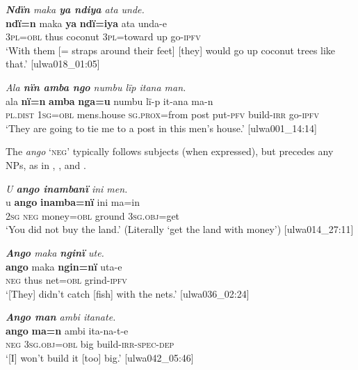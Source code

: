 \ea%
    \label{ex:clause:71}
          \textit{\textbf{Ndïn} maka \textbf{ya ndiya} ata unde.}\\
\gll    \textbf{ndï=n}    maka  \textbf{ya}      \textbf{ndï=iya}    ata  unda-e\\
    3\textsc{pl=obl}  thus  coconut  3\textsc{pl=}toward  up  go-\textsc{ipfv}\\
\glt `With them [= straps around their feet] [they] would go up coconut trees like that.’ [ulwa018\_01:05]
\z

\ea%
    \label{ex:clause:72}
          \textit{Ala \textbf{nïn amba ngo} numbu lïp itana man.}\\
\gll    ala      \textbf{nï=n}    \textbf{amba}      \textbf{nga=u}        numbu lï-p      it-ana    ma-n\\
    \textsc{pl.dist}  1\textsc{sg=obl}  mens.house  \textsc{sg.prox=}from  post    put-\textsc{pfv}  build\textsc{{}-irr} go\textsc{{}-ipfv}\\
\glt `They are going to tie me to a post in this men’s house.’ [ulwa001\_14:14]
\z

The  \textit{ango} ‘\textsc{neg}’ typically follows subjects (when expressed), but precedes any  NPs, as in , , and .

\ea%
    \label{ex:clause:73}
          \textit{U \textbf{ango inambanï} ini men.}\\
\gll    u    \textbf{ango}  \textbf{inamba=nï}  ini      ma=in\\
    2\textsc{sg}  \textsc{neg}  money=\textsc{obl}  ground    3\textsc{sg.obj}=get\\
\glt `You did not buy the land.’ (Literally ‘get the land with money’) [ulwa014\_27:11]
\z

\ea%
    \label{ex:clause:74}
          \textit{\textbf{Ango} maka \textbf{nginï} ute.}\\
\gll    \textbf{ango}  maka  \textbf{ngin=nï}  uta-e\\
    \textsc{neg}  thus  net=\textsc{obl}  grind-\textsc{ipfv}\\
\glt `[They] didn’t catch [fish] with the nets.’ [ulwa036\_02:24]
\z

\ea%
    \label{ex:clause:75}
          \textit{\textbf{Ango man} ambi itanate.}\\
\gll    \textbf{ango}  \textbf{ma=n}      ambi  ita-na-t-e\\
    \textsc{neg}  3\textsc{sg.obj=obl}  big    build-\textsc{irr-spec-dep}\\
\glt `[I] won’t build it [too] big.’ [ulwa042\_05:46]
\z

